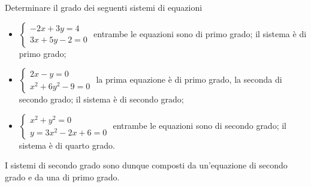 \begin{esempio}
Determinare il grado dei seguenti sistemi di equazioni

\begin{itemize}
\item \(\left\{\begin{array}{l}-2x+3y=4 \\3x+5y-2=0\end{array}\right.\) entrambe 
le equazioni sono di primo grado; il sistema è di primo grado;
\item \(\left\{\begin{array}{l}2x-y=0 \\x^2+6y^2-9=0\end{array}\right.\) la prima 
equazione è di primo grado, la seconda di secondo grado; il sistema è di 
secondo 
grado;
\item \(\left\{\begin{array}{l}x^2+y^2=0 \\y=3x^2-2x+6=0\end{array}\right.\) 
entrambe le equazioni sono di secondo grado; il sistema è di quarto grado.
\end{itemize}
\end{esempio}
I sistemi di secondo grado sono dunque composti da un'equazione di secondo 
grado 
e da una di primo grado.

